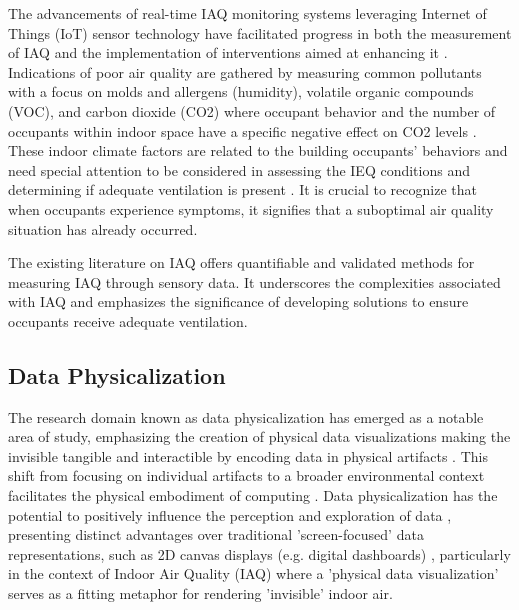 The advancements of real-time IAQ monitoring systems leveraging Internet of Things (IoT) sensor technology have facilitated progress in both the measurement of IAQ and the implementation of interventions aimed at enhancing it \cite{pantelic_transformational_2022}. Indications of poor air quality are gathered by measuring common pollutants with a focus on molds and allergens (humidity), volatile organic compounds (VOC), and carbon dioxide (CO2) \cite{klepeis_national_2001} where occupant behavior and the number of occupants within indoor space have a specific negative effect on CO2 levels \cite{fromme_indoor_2023}. These indoor climate factors are related to the building occupants’ behaviors and need special attention to be considered in assessing the IEQ conditions and determining if adequate ventilation is present \cite{du_indoor_2020}. It is crucial to recognize that when occupants experience symptoms, it signifies that a suboptimal air quality situation has already occurred.

The existing literature on IAQ offers quantifiable and validated methods for measuring IAQ through sensory data. It underscores the complexities associated with IAQ and emphasizes the significance of developing solutions to ensure occupants receive adequate ventilation.


\subsection{Data Physicalization}
\label{sec:phys}

The research domain known as data physicalization \cite{alexander_data_2019, jansen_opportunities_2015} has emerged as a notable area of study, emphasizing the creation of physical data visualizations making the invisible tangible and interactible by encoding data in physical artifacts \cite{ranasinghe_encoding_2023}. This shift from focusing on individual artifacts to a broader environmental context facilitates the physical embodiment of computing \cite{dragicevic_data_2020}. Data physicalization has the potential to positively influence the perception and exploration of data \cite{jansen_opportunities_2015, wang_emotional_2019, stusak_evaluating_2015}, presenting distinct advantages over traditional 'screen-focused' data representations, such as 2D canvas displays (e.g. digital dashboards) \cite{hornecker_design_2023, jansen_evaluating_2013}, particularly in the context of Indoor Air Quality (IAQ) where a 'physical data visualization' serves as a fitting metaphor for rendering 'invisible' indoor air.

